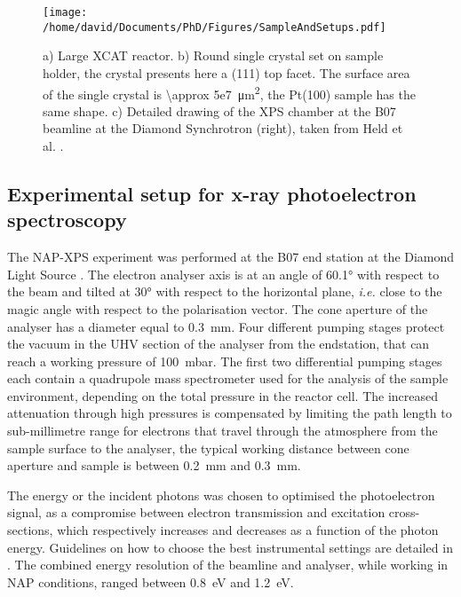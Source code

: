 \begin{figure}[!htb]
    \centering
    \texttt{[image: /home/david/Documents/PhD/Figures/SampleAndSetups.pdf]}
    \caption{
        a) Large XCAT reactor.
        b) Round single crystal set on sample holder, the crystal presents here a (111) top facet.
        The surface area of the single crystal is \qty{\approx 5e7}{\um^2}, the Pt(100) sample has the same shape.
        c) Detailed drawing of the XPS chamber at the B07 beamline at the Diamond Synchrotron (right), taken from Held et al. \parencite*{Held2020}.
    }
    \label{fig:SampleSXRD}
\end{figure}

\subsection{Experimental setup for x-ray photoelectron spectroscopy} \label{sec:XPS111}

The NAP-XPS experiment was performed at the B07 end station at the Diamond Light Source \parencite{Held2020}.
The electron analyser axis is at an angle of \ang{60.1} with respect to the beam and tilted at \ang{30} with respect to the horizontal plane, \textit{i.e.} close to the magic angle with respect to the polarisation vector.
The cone aperture of the analyser has a diameter equal to \qty{0.3}{\mm}.
Four different pumping stages protect the vacuum in the UHV section of the analyser from the endstation, that can reach a working pressure of \qty{100}{\milli\bar}.
The ﬁrst two differential pumping stages each contain a quadrupole mass spectrometer used for the analysis of the sample environment, depending on the total pressure in the reactor cell.
The increased attenuation through high pressures is compensated by limiting the path length to sub-millimetre range for electrons that travel through the atmosphere from the sample surface to the analyser, the typical working distance between cone aperture and sample is between \qty{0.2}{\mm} and \qty{0.3}{\mm}.

The energy or the incident photons was chosen to optimised the photoelectron signal, as a compromise between electron transmission and excitation cross-sections, which respectively increases and decreases as a function of the photon energy.
Guidelines on how to choose the best instrumental settings are detailed in \parencite{Held2020}.
The combined energy resolution of the beamline and analyser, while working in NAP conditions, ranged between \qty{0.8}{\eV} and \qty{1.2}{\eV}.